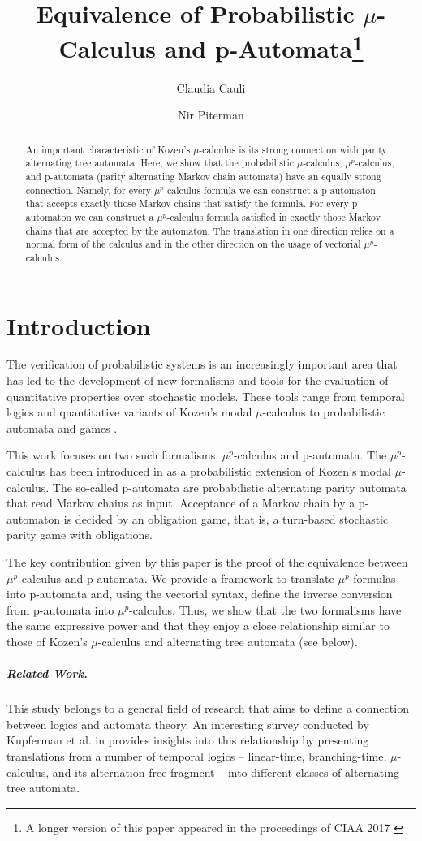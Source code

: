 \documentclass[a4paper,UKenglish]{oasics-v2016}
\title{Equivalence of Probabilistic $\mu$-Calculus and p-Automata\footnote{A 
longer version of this paper appeared in the proceedings of CIAA 2017 
\cite{ciaa17}}}
\author[]{Claudia Cauli}
\author[]{Nir Piterman}
\affil[]{University of Leicester, Department of Informatics, Leicester, UK\\
\texttt{cc488@le.ac.uk, nir.piterman@gmail.com}}
\begin{document}
	
	\maketitle
	
	\begin{abstract}
An important characteristic of Kozen's $\mu$-calculus is its
strong connection with parity alternating tree automata.
Here, 
we show that the probabilistic $\mu$-calculus, $\mu^p$-calculus, and
p-automata (parity alternating Markov chain automata) have an
equally strong connection.
Namely, for every $\mu^p$-calculus formula we can construct a
p-automaton that accepts exactly those Markov chains that satisfy
the formula.
For every p-automaton we can construct a $\mu^p$-calculus formula
satisfied in exactly those Markov chains that are accepted by the
automaton.
The translation in one direction relies on a normal form of the
calculus and in the other direction on the usage of vectorial
$\mu^p$-calculus.
	\end{abstract}

\section{Introduction}
The verification of probabilistic systems is an increasingly important area
that has led to the development of new formalisms and tools for the evaluation
of quantitative properties over stochastic models.
These tools range from temporal logics and quantitative variants of Kozen's
modal $\mu$-calculus \cite{Koz83} to probabilistic automata and games
\cite{BK08,HK97,Mio2012a,Mio12,MS15}.

This work focuses on two such formalisms, $\mu^p$-calculus and p-automata.
The $\mu^p$-calculus has been introduced in \cite{CKP15} as a
probabilistic extension of Kozen's modal $\mu$-calculus.
The so-called p-automata \cite{CP13} are probabilistic alternating
parity automata that read Markov chains as input. 
Acceptance of a Markov chain by a p-automaton is decided by an
obligation game, that is, a turn-based stochastic parity game with
obligations. 

The key contribution given by this paper is the proof of the
equivalence between $\mu^p$-calculus and p-automata. 
We provide a framework to translate $\mu^p$-formulas into p-automata
and, using the vectorial syntax, define the inverse conversion from
p-automata into $\mu^p$-calculus. Thus, we show that the two formalisms
have the same expressive power and that they enjoy a 
close
relationship similar to those of Kozen's $\mu$-calculus and
alternating tree automata (see below).
%
\subparagraph{Related Work.}This study belongs to a general field of research 
that 
aims to define a connection between logics and automata theory.
An interesting survey conducted by Kupferman et al. in \cite{KVW00} provides 
insights into this relationship by presenting translations from a number of 
temporal logics -- linear-time, branching-time, $\mu$-calculus, and its 
alternation-free fragment -- into different classes of alternating tree 
automata.
\end{document}
